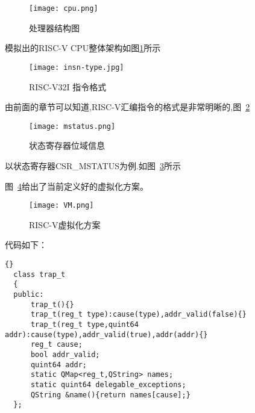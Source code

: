 \begin{figure}[h]
  \centering
  \texttt{[image: cpu.png]}
  \caption{处理器结构图}
  \label{fig:cpu}
\end{figure}
模拟出的RISC-V CPU整体架构如图\ref{fig:cpu}所示


\begin{figure}[h]
  \centering
  \texttt{[image: insn-type.jpg]}
  \caption{RISC-V32I 指令格式}
  \label{fig:insn-type}
\end{figure}
由前面的章节可以知道,RISC-V汇编指令的格式是非常明晰的,图~\ref{fig:insn-type}


\begin{figure}[h]
  \centering
  \texttt{[image: mstatus.png]}
  \caption{状态寄存器位域信息}
  \label{fig:mstatus}
\end{figure}
以状态寄存器CSR\_MSTATUS为例.如图~\ref{fig:mstatus}所示


图~\ref{fig:VM}给出了当前定义好的虚拟化方案。
\begin{figure}[h]
  \centering
  \texttt{[image: VM.png]}
  \caption{RISC-V虚拟化方案}
  \label{fig:VM}
\end{figure}

代码如下：
\begin{lstlisting}{}
  class trap_t
  {
  public:
      trap_t(){}
      trap_t(reg_t type):cause(type),addr_valid(false){}
      trap_t(reg_t type,quint64 addr):cause(type),addr_valid(true),addr(addr){}
      reg_t cause;
      bool addr_valid;
      quint64 addr;
      static QMap<reg_t,QString> names;
      static quint64 delegable_exceptions;
      QString &name(){return names[cause];}
  };        
\end{lstlisting}